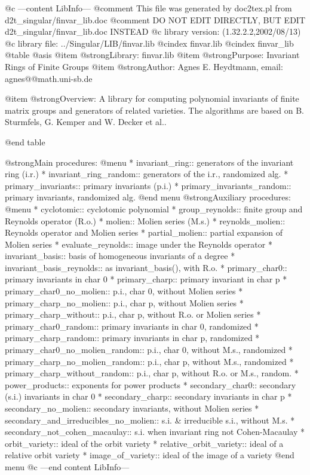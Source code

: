 @c ---content LibInfo---
@comment This file was generated by doc2tex.pl from d2t_singular/finvar_lib.doc
@comment DO NOT EDIT DIRECTLY, BUT EDIT d2t_singular/finvar_lib.doc INSTEAD
@c library version: (1.32.2.2,2002/08/13)
@c library file: ../Singular/LIB/finvar.lib
@cindex finvar.lib
@cindex finvar_lib
@table @asis
@item @strong{Library:}
finvar.lib
@item @strong{Purpose:}
    Invariant Rings of Finite Groups
@item @strong{Author:}
Agnes E. Heydtmann, email: agnes@@math.uni-sb.de

@item @strong{Overview:}
A library for computing polynomial invariants of finite matrix groups and
generators of related varieties. The algorithms are based on B. Sturmfels,
G. Kemper and W. Decker et al..

@end table

@strong{Main procedures:}
@menu
* invariant_ring:: generators of the invariant ring (i.r.)
* invariant_ring_random:: generators of the i.r., randomized alg.
* primary_invariants:: primary invariants (p.i.)
* primary_invariants_random:: primary invariants, randomized alg.
@end menu
@strong{Auxiliary procedures:}
@menu
* cyclotomic:: cyclotomic polynomial
* group_reynolds:: finite group and Reynolds operator (R.o.)
* molien:: Molien series (M.s.)
* reynolds_molien:: Reynolds operator and Molien series
* partial_molien:: partial expansion of Molien series
* evaluate_reynolds:: image under the Reynolds operator
* invariant_basis:: basis of homogeneous invariants of a degree
* invariant_basis_reynolds:: as invariant_basis(), with R.o.
* primary_char0:: primary invariants in char 0
* primary_charp:: primary invariant in char p
* primary_char0_no_molien:: p.i., char 0, without Molien series
* primary_charp_no_molien:: p.i., char p, without Molien series
* primary_charp_without:: p.i., char p, without R.o. or Molien series
* primary_char0_random:: primary invariants in char 0, randomized
* primary_charp_random:: primary invariants in char p, randomized
* primary_char0_no_molien_random:: p.i., char 0, without M.s., randomized
* primary_charp_no_molien_random:: p.i., char p, without M.s., randomized
* primary_charp_without_random:: p.i., char p, without R.o. or M.s., random.
* power_products:: exponents for power products
* secondary_char0:: secondary (s.i.) invariants in char 0
* secondary_charp:: secondary invariants in char p
* secondary_no_molien:: secondary invariants, without Molien series
* secondary_and_irreducibles_no_molien:: s.i. & irreducible s.i., without M.s.
* secondary_not_cohen_macaulay:: s.i. when invariant ring not Cohen-Macaulay
* orbit_variety:: ideal of the orbit variety
* relative_orbit_variety:: ideal of a relative orbit variety
* image_of_variety:: ideal of the image of a variety
@end menu
@c ---end content LibInfo---

